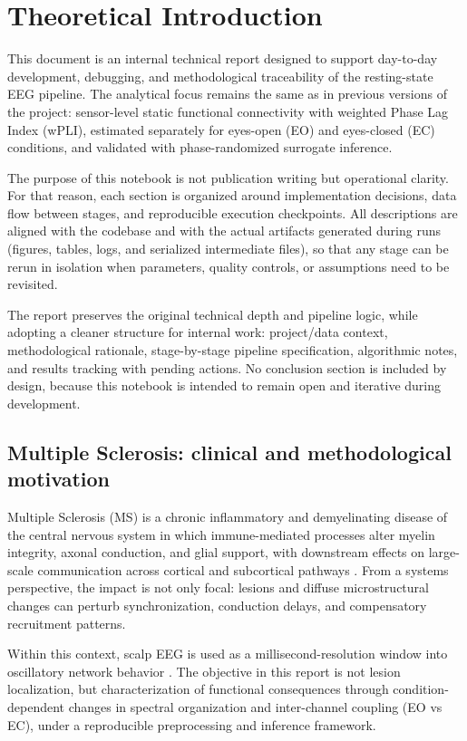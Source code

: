 \section{Theoretical Introduction}

This document is an internal technical report designed to support day-to-day development, debugging, and methodological traceability of the resting-state EEG pipeline. The analytical focus remains the same as in previous versions of the project: sensor-level static functional connectivity with weighted Phase Lag Index (wPLI), estimated separately for eyes-open (EO) and eyes-closed (EC) conditions, and validated with phase-randomized surrogate inference.

The purpose of this notebook is not publication writing but operational clarity. For that reason, each section is organized around implementation decisions, data flow between stages, and reproducible execution checkpoints. All descriptions are aligned with the \Julia{} codebase and with the actual artifacts generated during runs (figures, tables, logs, and serialized intermediate files), so that any stage can be rerun in isolation when parameters, quality controls, or assumptions need to be revisited.

The report preserves the original technical depth and pipeline logic, while adopting a cleaner structure for internal work: project/data context, methodological rationale, stage-by-stage pipeline specification, algorithmic notes, and results tracking with pending actions. No conclusion section is included by design, because this notebook is intended to remain open and iterative during development.

\subsection{Multiple Sclerosis: clinical and methodological motivation}

Multiple Sclerosis (MS) is a chronic inflammatory and demyelinating disease of the central nervous system in which immune-mediated processes alter myelin integrity, axonal conduction, and glial support, with downstream effects on large-scale communication across cortical and subcortical pathways \citep{Mestre2021}. From a systems perspective, the impact is not only focal: lesions and diffuse microstructural changes can perturb synchronization, conduction delays, and compensatory recruitment patterns.

Within this context, scalp EEG is used as a millisecond-resolution window into oscillatory network behavior \citep{Cohen2014,Sanei2022}. The objective in this report is not lesion localization, but characterization of functional consequences through condition-dependent changes in spectral organization and inter-channel coupling (EO vs EC), under a reproducible preprocessing and inference framework.

